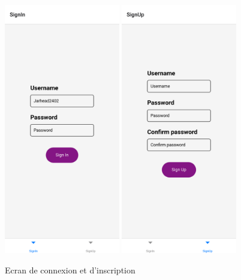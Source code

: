 \documentclass[12pt]{article}
\begin{document}
        \begin{figure}[H]
            \centering
            \includegraphics[width=0.45\textwidth]{images/signIn}
            \includegraphics[width=0.45\textwidth]{images/signUp}
            \caption{Ecran de connexion et d'inscription}
            \label{fig:connexion}
        \end{figure}
\end{document}
